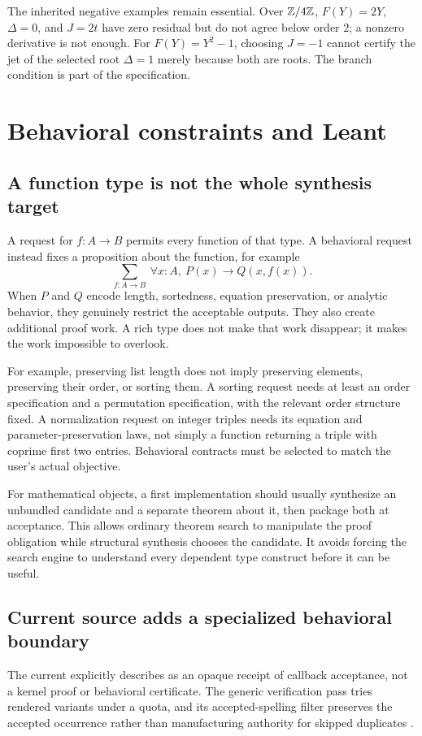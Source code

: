 \documentclass[11pt,a4paper]{article}
\newcommand{\code}[1]{\texttt{\detokenize{#1}}}
\theoremstyle{plain}\newtheorem{proposition}{Proposition}[section]
\theoremstyle{definition}\newtheorem{definition}[proposition]{Definition}
\theoremstyle{remark}\newtheorem{remark}[proposition]{Remark}
\begin{document}
The inherited negative examples remain essential. Over \(\mathbb Z/4\mathbb Z\), \(F(Y)=2Y\), \(\Delta=0\), and \(J=2t\) have zero residual but do not agree below order \(2\); a nonzero derivative is not enough. For \(F(Y)=Y^2-1\), choosing \(J=-1\) cannot certify the jet of the selected root \(\Delta=1\) merely because both are roots. The branch condition is part of the specification.

\section{Behavioral constraints and Leant}\label{sec:leant}
\subsection{A function type is not the whole synthesis target}
A request for \(f:A\to B\) permits every function of that type. A behavioral request instead fixes a proposition about the function, for example
\[
 \sum_{f:A\to B}\ \forall x:A,\ P(x)\to Q(x,f(x)).
\]
When \(P\) and \(Q\) encode length, sortedness, equation preservation, or analytic behavior, they genuinely restrict the acceptable outputs. They also create additional proof work. A rich type does not make that work disappear; it makes the work impossible to overlook.

For example, preserving list length does not imply preserving elements, preserving their order, or sorting them. A sorting request needs at least an order specification and a permutation specification, with the relevant order structure fixed. A normalization request on integer triples needs its equation and parameter-preservation laws, not simply a function returning a triple with coprime first two entries. Behavioral contracts must be selected to match the user's actual objective.

For mathematical objects, a first implementation should usually synthesize an unbundled candidate and a separate theorem about it, then package both at acceptance. This allows ordinary theorem search to manipulate the proof obligation while structural synthesis chooses the candidate. It avoids forcing the search engine to understand every dependent type construct before it can be useful.

\subsection{Current source adds a specialized behavioral boundary}
The current \code{Verification.hs} explicitly describes \code{Verified} as an opaque receipt of callback acceptance, not a kernel proof or behavioral certificate. The generic verification pass tries rendered variants under a quota, and its accepted-spelling filter preserves the accepted occurrence rather than manufacturing authority for skipped duplicates \cite{leantverify}.
\end{document}
